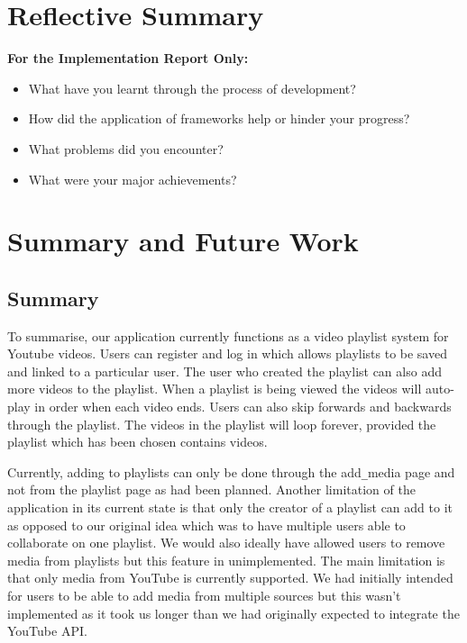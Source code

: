\documentclass{sig-alt-release2}
\begin{document}

\section{Reflective Summary}
{\bf For the Implementation Report Only:}
\begin{itemize}
\item	What have you learnt through the process of development? 
\item	How did the application of frameworks help or hinder your progress? 
\item	What problems did you encounter? 
\item	What were your major achievements?
\end{itemize}


\section{Summary and Future Work}

\subsection{Summary}

To summarise, our application currently functions as a video playlist system for Youtube videos. Users can register and log in which allows playlists to be saved and linked to a particular user. The user who created the playlist can also add more videos to the playlist. When a playlist is being viewed the videos will auto-play in order when each video ends. Users can also skip forwards and backwards through the playlist. The videos in the playlist will loop forever, provided the playlist which has been chosen contains videos.

Currently, adding to playlists can only be done through the add\verb=_=media page and not from the playlist page as had been planned. Another limitation of the application in its current state is that only the creator of a playlist can add to it as opposed to our original idea which was to have multiple users able to collaborate on one playlist. We would also ideally have allowed users to remove media from playlists but this feature in unimplemented. The main limitation is that only media from YouTube is currently supported. We had initially intended for users to be able to add media from multiple sources but this wasn't implemented as it took us longer than we had originally expected to integrate the YouTube API.
\end{document}
